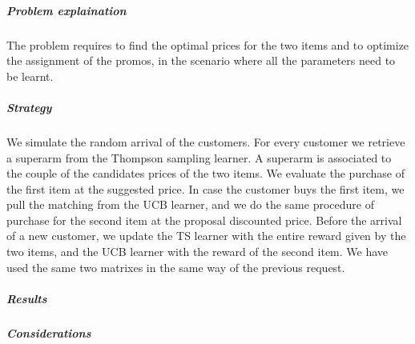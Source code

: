 \subparagraph*{Problem explaination}
The problem requires to find the optimal prices for the two items and to optimize the assignment of the promos, in the scenario where all the parameters need to be learnt.
\subparagraph*{Strategy}
We simulate the random arrival of the customers. For every customer we retrieve a superarm from the Thompson sampling learner. A superarm is associated to the couple of the candidates prices of the two items. We evaluate the purchase of the first item at the suggested price. In case the customer buys the first item, we pull the matching from the UCB learner, and we do the same procedure of purchase for the second item at the proposal discounted price. Before the arrival of a new customer, we update the TS learner with the entire reward given by the two items, and the UCB learner with the reward of the second item. We have used the same two matrixes in the same way of the previous request.
\subparagraph*{Results}
\subparagraph*{Considerations}